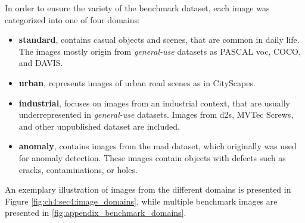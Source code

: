 In order to ensure the variety of the benchmark dataset, each image was categorized into one of four domains:
%
\begin{itemize}
	\item \textbf{standard}, contains casual objects and scenes, that are common in daily life.
	The images mostly origin from \textit{general-use} datasets as PASCAL \gls{voc}, COCO, and DAVIS.
	\item \textbf{urban}, represents images of urban road scenes as in CityScapes.
	\item \textbf{industrial}, focuses on images from an industrial context, that are usually underrepresented in \textit{general-use} datasets.
	Images from \gls{d2s}, MVTec Screws, and other unpublished dataset are included.
	\item \textbf{anomaly}, contains images from the \gls{mad} dataset, which originally was used for anomaly detection.
	These images contain objects with defects such as cracks, contaminations, or holes.
\end{itemize}

An exemplary illustration of images from the different domains is presented in Figure \ref{fig:ch4:sec4:image_domains}, while multiple benchmark images are presented in \ref{fig:appendix_benchmark_domains}.

